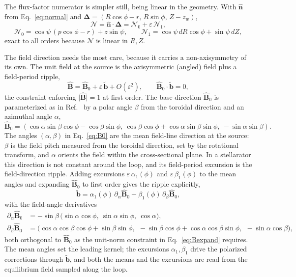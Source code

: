 \documentclass[11pt]{article}
\newcommand{\Del}{\bm{\Delta}}
\newcommand{\nhat}{\hat{\bm{n}}}
\newcommand{\Bhat}{\hat{\bm{B}}}
\newcommand{\bperp}{\tilde{\bm{b}}}
\newcommand{\eps}{\varepsilon}
\newcommand{\Order}[1]{O(\eps^{#1})}
\begin{document}
The flux-factor numerator is simpler still, being linear in the geometry. With $\nhat$ from Eq.~\eqref{eq:normal} and $\Del=(R\cos\phi-r,\,R\sin\phi,\,Z-z_w)$,
\begin{equation}
\mathcal{N}=\nhat\cdot\Del=\mathcal{N}_0+\eps\,\mathcal{N}_1,
\label{eq:Nexpand}
\end{equation}
\begin{equation}
\mathcal{N}_0=\cos\psi\,(p\cos\phi-r)+z\sin\psi,\qquad
\mathcal{N}_1=\cos\psi\,dR\cos\phi+\sin\psi\,dZ,
\end{equation}
exact to all orders because $\mathcal{N}$ is linear in $R,Z$.

The field direction needs the most care, because it carries a non-axisymmetry of its own. The unit field at the source is the axisymmetric (angled) field plus a field-period ripple,
\begin{equation}
\Bhat=\Bhat_0+\eps\,\bperp+\Order{2},\qquad \Bhat_0\cdot\bperp=0,
\label{eq:Bexpand}
\end{equation}
the constraint enforcing $\lvert\Bhat\rvert=1$ at first order. The base direction $\Bhat_0$ is parameterized as in Ref.~\cite{schwartz2025} by a polar angle $\beta$ from the toroidal direction and an azimuthal angle $\alpha$,
\begin{equation}
\Bhat_0=(\cos\alpha\sin\beta\cos\phi-\cos\beta\sin\phi,\ \cos\beta\cos\phi+\cos\alpha\sin\beta\sin\phi,\ -\sin\alpha\sin\beta).
\label{eq:B0}
\end{equation}
The angles $(\alpha,\beta)$ in Eq.~\eqref{eq:B0} are the mean field-line direction at the source: $\beta$ is the field pitch measured from the toroidal direction, set by the rotational transform, and $\alpha$ orients the field within the cross-sectional plane. In a stellarator this direction is not constant around the loop, and its field-period excursion is the field-direction ripple. Adding excursions $\eps\,\alpha_1(\phi)$ and $\eps\,\beta_1(\phi)$ to the mean angles and expanding $\Bhat_0$ to first order gives the ripple explicitly,
\begin{equation}
\bperp=\alpha_1(\phi)\,\partial_\alpha\Bhat_0+\beta_1(\phi)\,\partial_\beta\Bhat_0,
\label{eq:btilde}
\end{equation}
with the field-angle derivatives
\begin{align}
\partial_\alpha\Bhat_0&=-\sin\beta\,\big(\sin\alpha\cos\phi,\ \sin\alpha\sin\phi,\ \cos\alpha\big),\label{eq:dBda}\\
\partial_\beta\Bhat_0&=\big(\cos\alpha\cos\beta\cos\phi+\sin\beta\sin\phi,\ \ -\sin\beta\cos\phi+\cos\alpha\cos\beta\sin\phi,\ \ -\sin\alpha\cos\beta\big),\label{eq:dBdb}
\end{align}
both orthogonal to $\Bhat_0$ as the unit-norm constraint in Eq.~\eqref{eq:Bexpand} requires. The mean angles set the leading kernel; the excursions $\alpha_1,\beta_1$ drive the polarized corrections through $\bperp$, and both the means and the excursions are read from the equilibrium field sampled along the loop.
\end{document}
